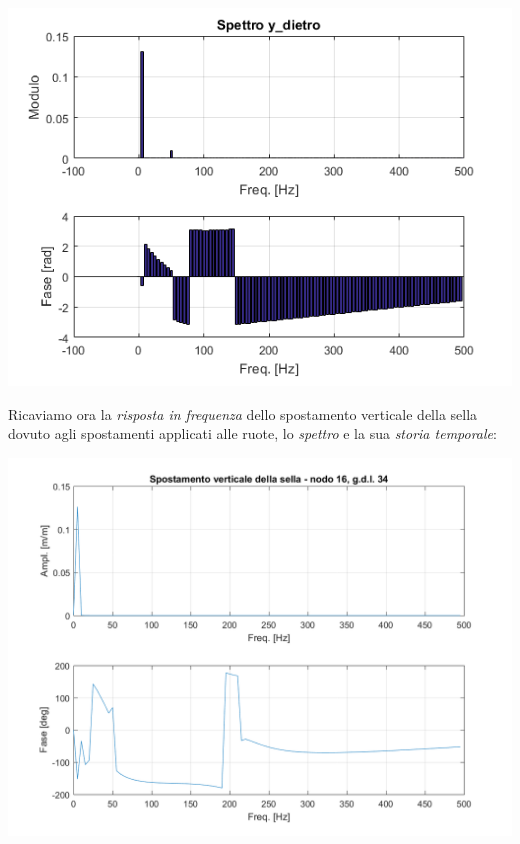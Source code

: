 \documentclass[12pt, a4paper]{article}
\begin{document}
	\begin{center}
		\includegraphics[scale=0.8]{spettro_y_dietro}
	\end{center}
	\clearpage
	Ricaviamo ora la \textit{risposta in frequenza} dello spostamento verticale della sella dovuto agli spostamenti applicati alle ruote, lo \textit{spettro} e la sua \textit{storia temporale}: 
	\\  
	\begin{center}
		\includegraphics[scale=0.8]{FRF_6}
	\end{center}
	
\end{document}
